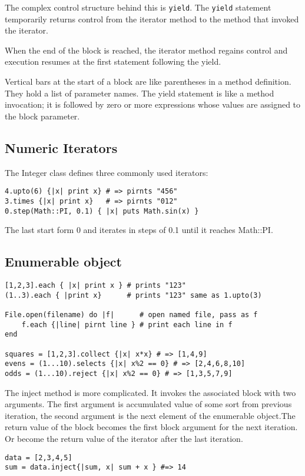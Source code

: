 \documentclass[11pt, a4paper]{book}
\begin{document}
The complex control structure behind this is \verb|yield|. The \verb|yield|
statement temporarily returns control from the iterator method to the method
that invoked the iterator.

When the end of the block is reached, the iterator method regains control and
execution resumes at the first statement following the yield.

Vertical bars at the start of a block are like parentheses in a method
definition. They hold a list of parameter names. The yield statement is like a
method invocation; it is followed by zero or more expressions whose values are
assigned to the block parameter.
\subsection{Numeric Iterators}
The Integer class defines three commonly used iterators:
\begin{verbatim}
4.upto(6) {|x| print x} # => pirnts "456"
3.times {|x| print x}   # => pirnts "012"
0.step(Math::PI, 0.1) { |x| puts Math.sin(x) }
\end{verbatim}
The last start form 0 and iterates in steps of 0.1 until it reaches Math::PI.
\subsection{Enumerable object}
\begin{verbatim}
[1,2,3].each { |x| print x } # prints "123"
(1..3).each { |print x}      # prints "123" same as 1.upto(3)

File.open(filename) do |f|      # open named file, pass as f
    f.each {|line| pirnt line } # print each line in f
end

squares = [1,2,3].collect {|x| x*x} # => [1,4,9]
evens = (1...10).selects {|x| x%2 == 0} # => [2,4,6,8,10]
odds = (1...10).reject {|x| x%2 == 0} # => [1,3,5,7,9]
\end{verbatim}
The inject method is more complicated. It invokes the associated block with two
arguments. The first argument is accumulated value of some sort from previous
iteration, the second argument is the next element of the enumerable object.The
return value of the block becomes the first block argument for the next
iteration. Or become the return value of the iterator after the last iteration.
\begin{verbatim}
data = [2,3,4,5]
sum = data.inject{|sum, x| sum + x } #=> 14
\end{verbatim}
\end{document}

